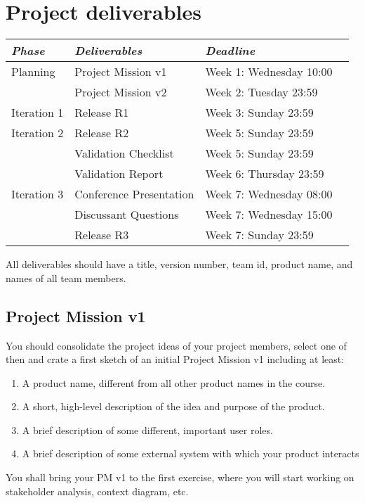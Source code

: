 \documentclass{project}
\begin{document}
\section{Project deliverables}
\begin{tabular}{l |l p{5cm}  l}
{\it Phase} & {\it Deliverables} & {\it Deadline} \\
\hline
Planning & Project Mission v1& Week 1: Wednesday 10:00\\
         & Project Mission v2& Week 2: Tuesday 23:59\\
Iteration 1 & Release R1 & Week 3: Sunday 23:59 \\
Iteration 2 & Release R2  & Week 5: Sunday 23:59\\
            & Validation Checklist & Week 5: Sunday 23:59\\
            & Validation Report & Week 6: Thursday 23:59\\
            Iteration 3 & Conference Presentation & Week 7: Wednesday 08:00\\
            & Discussant Questions & Week 7: Wednesday 15:00\\
            & Release R3 & Week 7: Sunday 23:59\\
      
\end{tabular}
\vskip3mm

\noindent All deliverables should have a title, version number, team id, product name, and names of all team members. 

\subsection{Project Mission v1}

You should consolidate the project ideas of your project members, select one of then and crate a first sketch of an initial Project Mission v1 including at least:
\begin{enumerate}[noitemsep]
  \item A product name, different from all other product names in the course. 
  \item A short, high-level description of the idea and purpose of the product. 
  \item A brief description of some different, important user roles.
  \item A brief description of some external system with which your product interacts
\end{enumerate}
You shall bring your PM v1 to the first exercise, where you will start working on stakeholder analysis, context diagram, etc.
\end{document}
